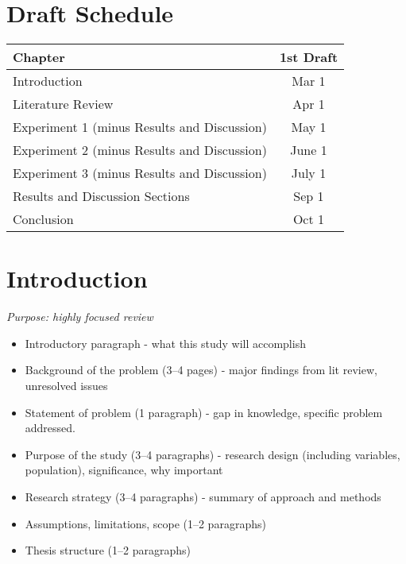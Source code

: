 
\def\baselevelheader{1}

\section{Draft Schedule}
\label{draftschedule}


  \begin{tabular}{ | l || c | }
    \hline
    Chapter & 1st Draft \\ \hline
    Introduction & Mar 1 \\ \hline
    Literature Review & Apr 1 \\ \hline
    Experiment 1 (minus Results and Discussion) & May 1 \\ \hline
    Experiment 2 (minus Results and Discussion) & June 1 \\ \hline
    Experiment 3 (minus Results and Discussion) & July 1 \\ \hline
    Results and Discussion Sections & Sep 1 \\ \hline
    Conclusion & Oct 1 \\ \hline
  \end{tabular}


\section{Introduction}
\label{introduction}

\emph{Purpose: highly focused review}

\begin{itemize}
\item Introductory paragraph - what this study will accomplish

\item Background of the problem (3--4 pages) - major findings from lit review, unresolved issues

\item Statement of problem (1 paragraph) - gap in knowledge, specific problem addressed.

\item Purpose of the study (3--4 paragraphs) - research design (including variables, population), significance, why important

\item Research strategy (3--4 paragraphs) - summary of approach and methods

\item Assumptions, limitations, scope (1--2 paragraphs)

\item Thesis structure (1--2 paragraphs)

\end{itemize}

